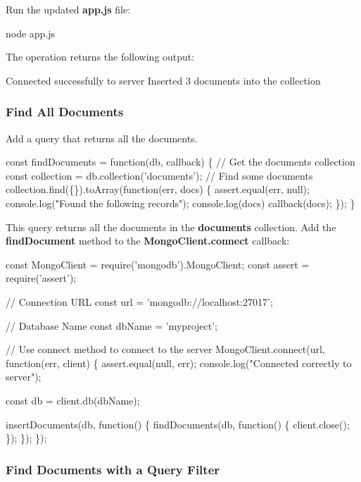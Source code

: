 Run the updated {\bfseries app.\+js} file\+:


\begin{DoxyCode}
node app.js
\end{DoxyCode}


The operation returns the following output\+:


\begin{DoxyCode}
Connected successfully to server
Inserted 3 documents into the collection
\end{DoxyCode}


\subsubsection*{Find All Documents}

Add a query that returns all the documents.


\begin{DoxyCode}
const findDocuments = function(db, callback) \{
  // Get the documents collection
  const collection = db.collection('documents');
  // Find some documents
  collection.find(\{\}).toArray(function(err, docs) \{
    assert.equal(err, null);
    console.log("Found the following records");
    console.log(docs)
    callback(docs);
  \});
\}
\end{DoxyCode}


This query returns all the documents in the {\bfseries documents} collection. Add the {\bfseries find\+Document} method to the {\bfseries Mongo\+Client.\+connect} callback\+:


\begin{DoxyCode}
const MongoClient = require('mongodb').MongoClient;
const assert = require('assert');

// Connection URL
const url = 'mongodb://localhost:27017';

// Database Name
const dbName = 'myproject';

// Use connect method to connect to the server
MongoClient.connect(url, function(err, client) \{
  assert.equal(null, err);
  console.log("Connected correctly to server");

  const db = client.db(dbName);

  insertDocuments(db, function() \{
    findDocuments(db, function() \{
      client.close();
    \});
  \});
\});
\end{DoxyCode}


\subsubsection*{Find Documents with a Query Filter}

